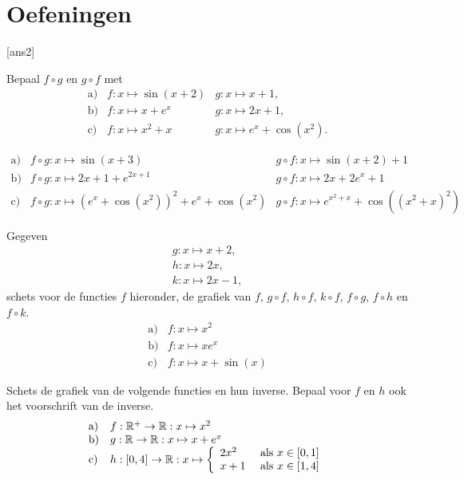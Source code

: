 \newpage

\section{Oefeningen}

[ans2]

\begin{oefening2}
Bepaal $f\circ g$ en $g\circ f$ met
\[
\begin{array}{lll}
\mbox{a)} & f:x\mapsto \sin(x+2) & g:x\mapsto x+1,\\
\mbox{b)} & f:x\mapsto x+e^x & g:x\mapsto 2x+1,\\
\mbox{c)} & f:x\mapsto x^2 + x & g:x\mapsto e^x + \cos(x^2).
\end{array}
\]

\begin{opl}
\[
\begin{array}{lll}
\mbox{a)} & f\circ g:x\mapsto \sin(x+3) & g\circ f:x\mapsto \sin(x+2)+1\\
\mbox{b)} & f\circ g:x\mapsto 2x+1+e^{2x+1} & g\circ f:x\mapsto 2x+2e^x+1\\
\mbox{c)} & f\circ g:x\mapsto (e^x+\cos(x^2))^2+e^x+\cos(x^2) & g\circ f:x\mapsto
e^{x^2+x}+\cos((x^2+x)^2)
\end{array}
\]
\end{opl}
\end{oefening2}

\begin{oefening2}
Gegeven
\[
\begin{array}{l}
g:x\mapsto x+2,\\
h:x\mapsto 2x,\\
k:x\mapsto 2x-1,
\end{array}
\]
schets voor de functies $f$ hieronder, de grafiek van $f$, $g\circ f$,
$h\circ f$, $k\circ f$, $f \circ g$, $f \circ h$ en $f\circ k$.
\[
\begin{array}{ll}
\mbox{a)} & f:x\mapsto x^2\\
\mbox{b)} & f:x\mapsto x e^{x}\\
\mbox{c)} & f:x\mapsto x+ \sin(x)
\end{array}
\]
\end{oefening2}

\begin{oefening2}
Schets de grafiek van de volgende functies en hun inverse. Bepaal voor
$f$ en $h$ ook het voorschrift van de inverse.
\[
\begin{array}{ll}
\mbox{a)} & f: \R^+ \rightarrow \R: x\mapsto x^2\\
\mbox{b)} & g: \R \rightarrow \R: x\mapsto x + e^x\\
\mbox{c)} & h: [0,4] \rightarrow \R: x\mapsto
 \left\{\ba{ll} 2 x^2 & \mbox{ als } x \in [0,1]\\
               x+1   & \mbox{ als } x \in [1,4]
       \ea\right.
\end{array}
\]
\end{oefening2}

